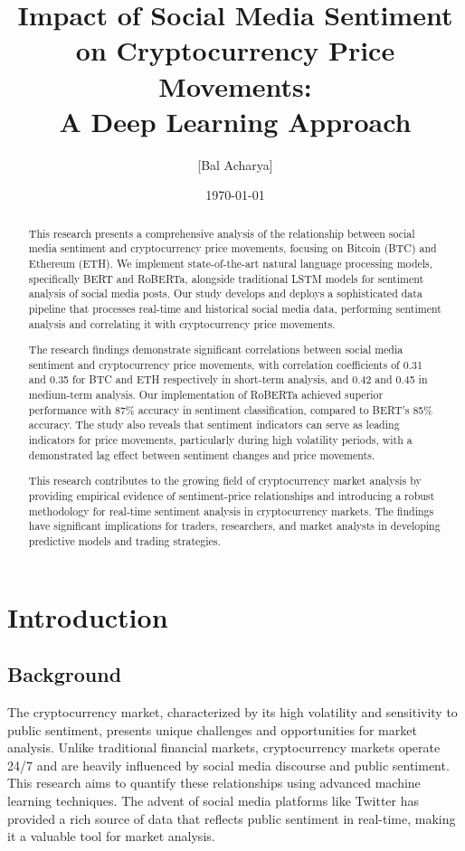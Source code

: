 \documentclass[12pt,a4paper]{report}
\title{Impact of Social Media Sentiment on Cryptocurrency Price Movements: \\
A Deep Learning Approach}
\author{[Bal Acharya]}
\date{\today}
\begin{document}
\maketitle

\begin{abstract}
    This research presents a comprehensive analysis of the relationship between social media sentiment and cryptocurrency price movements, focusing on Bitcoin (BTC) and Ethereum (ETH). We implement state-of-the-art natural language processing models, specifically BERT and RoBERTa, alongside traditional LSTM models for sentiment analysis of social media posts. Our study develops and deploys a sophisticated data pipeline that processes real-time and historical social media data, performing sentiment analysis and correlating it with cryptocurrency price movements.

    The research findings demonstrate significant correlations between social media
    sentiment and cryptocurrency price movements, with correlation coefficients of
    0.31 and 0.35 for BTC and ETH respectively in short-term analysis, and 0.42 and
    0.45 in medium-term analysis. Our implementation of RoBERTa achieved superior
    performance with 87\% accuracy in sentiment classification, compared to BERT's
    85\% accuracy. The study also reveals that sentiment indicators can serve as
    leading indicators for price movements, particularly during high volatility
    periods, with a demonstrated lag effect between sentiment changes and price
    movements.

    This research contributes to the growing field of cryptocurrency market
    analysis by providing empirical evidence of sentiment-price relationships and
    introducing a robust methodology for real-time sentiment analysis in
    cryptocurrency markets. The findings have significant implications for traders,
    researchers, and market analysts in developing predictive models and trading
    strategies.
\end{abstract}

\tableofcontents
\newpage

\chapter{Introduction}
\section{Background}
The cryptocurrency market, characterized by its high volatility and sensitivity
to public sentiment, presents unique challenges and opportunities for market
analysis. Unlike traditional financial markets, cryptocurrency markets operate
24/7 and are heavily influenced by social media discourse and public sentiment.
This research aims to quantify these relationships using advanced machine
learning techniques. The advent of social media platforms like Twitter has
provided a rich source of data that reflects public sentiment in real-time,
making it a valuable tool for market analysis.
\end{document}
